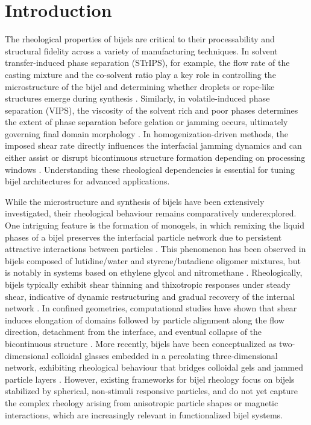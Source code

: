 
\section{Introduction}

The rheological properties of bijels are critical to their processability and structural fidelity across a variety of manufacturing techniques. In solvent transfer-induced phase separation 
(STrIPS), for example, the flow rate of the casting mixture and the co-solvent ratio play a key role in controlling the microstructure of the bijel and determining whether droplets or 
rope-like structures emerge during synthesis \cite{haase_continuous_2015, haase_situ_2016}. Similarly, in volatile-induced phase separation (VIPS), the viscosity of the solvent rich and poor 
phases determines the extent of phase separation before gelation or jamming occurs, ultimately governing final domain morphology \cite{wang_scalable_2020}. In homogenization-driven methods, 
the imposed shear rate directly influences the interfacial jamming dynamics and can either assist or disrupt bicontinuous structure formation depending on processing windows 
\cite{huang_bicontinuous_2017}. Understanding these rheological dependencies is essential for tuning bijel architectures for advanced applications.

While the microstructure and synthesis of bijels have been extensively investigated, their rheological behaviour remains comparatively underexplored. One intriguing feature is the formation of 
monogels, in which remixing the liquid phases of a bijel preserves the interfacial particle network due to persistent attractive interactions between particles \cite{sanz_colloidal_2009}. This 
phenomenon has been observed in bijels composed of lutidine/water and styrene/butadiene oligomer mixtures, but is notably in systems based on ethylene glycol and nitromethane 
\cite{sanz_colloidal_2009, bai_dynamics_2015, tavacoli_novel_2011}. Rheologically, bijels typically exhibit shear thinning and thixotropic responses under steady shear, indicative of dynamic 
restructuring and gradual recovery of the internal network \cite{macmillan_rheological_2019}. In confined geometries, computational studies have shown that shear induces elongation 
of domains followed by particle alignment along the flow direction, detachment from the interface, and eventual collapse of the bicontinuous structure \cite{bonaccorso_shear_2020}. More recently, 
bijels have been conceptualized as two-dimensional colloidal glasses embedded in a percolating three-dimensional network, exhibiting rheological behaviour that bridges colloidal gels and jammed 
particle layers \cite{ching_bijel_2022}. However, existing frameworks for bijel rheology focus on bijels stabilized by spherical, non-stimuli responsive particles, and do not yet capture the complex 
rheology arising from anisotropic particle shapes or magnetic interactions, which are increasingly relevant in functionalized bijel systems.

